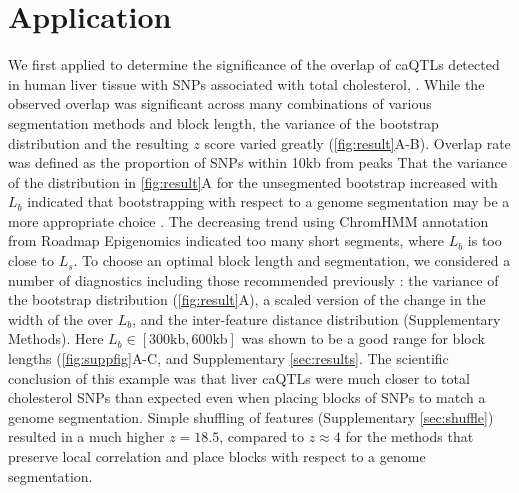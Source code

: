 \vspace*{-20pt}
\section{Application}

We first applied \bootranges to determine the significance of the
overlap of caQTLs detected in human liver tissue
\citep{CURRIN20211169} with SNPs associated with total cholesterol,
.
While the observed overlap was significant across many combinations of
various segmentation methods and block length, the variance of the
bootstrap distribution and the resulting $z$ score varied greatly
(\cref{fig:result}A-B). Overlap rate was defined as the proportion of
SNPs within 10kb from peaks 
That the variance of the distribution in \cref{fig:result}A for the
unsegmented bootstrap increased with $L_b$ indicated that
bootstrapping with respect to a genome
segmentation may be a more appropriate choice
\citep{bickel2010subsampling}. 
The decreasing trend using ChromHMM annotation from
Roadmap Epigenomics indicated too many short segments,
where $L_b$ is too close to $L_s$.
To choose an optimal block length and segmentation, 
we considered a number of diagnostics including
those recommended previously \citep{bickel2010subsampling}:
the variance of the bootstrap distribution (\cref{fig:result}A),
a scaled version of the change in the width of the
 over $L_b$,
and the inter-feature distance distribution (Supplementary Methods).
Here $L_b \in [300\textrm{kb},600\textrm{kb}]$ was shown to be a good range for block
lengths (\cref{fig:suppfig}A-C, and Supplementary \cref{sec:results}.
The scientific conclusion of this example was that liver caQTLs were
much closer to total cholesterol SNPs than expected even when placing
blocks of SNPs to match a genome segmentation.
Simple shuffling of features (Supplementary \cref{sec:shuffle})
resulted in a much higher $z = 18.5$, compared to $z \approx 4$ for
the methods that preserve local correlation and place blocks with
respect to a genome segmentation.

